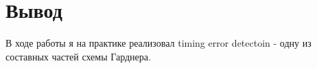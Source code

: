 \chapter{Вывод}
\label{ch:chap3}

В ходе работы я на практике реализовал timing error detectoin - одну из составных частей схемы Гарднера.
\endinput